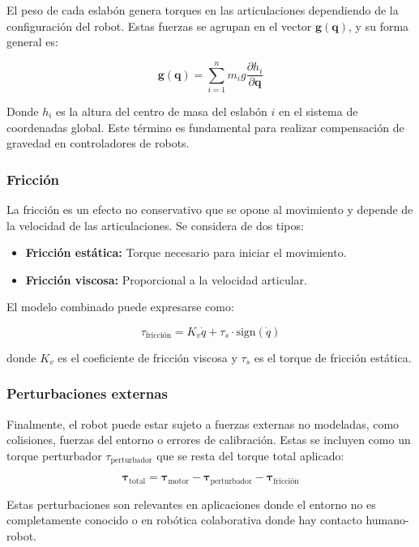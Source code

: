 El peso de cada eslabón genera torques en las articulaciones dependiendo de la configuración del robot. Estas fuerzas se agrupan en el vector \( \mathbf{g}(\mathbf{q}) \), y su forma general es:

\begin{equation}
	\mathbf{g}(\mathbf{q}) = \sum_{i=1}^{n} m_i g \frac{\partial h_i}{\partial \mathbf{q}}
\end{equation}

Donde \( h_i \) es la altura del centro de masa del eslabón \( i \) en el sistema de coordenadas global. Este término es fundamental para realizar compensación de gravedad en controladores de robots.

\subsubsection{Fricción}

La fricción es un efecto no conservativo que se opone al movimiento y depende de la velocidad de las articulaciones. Se considera de dos tipos:

\begin{itemize}
	\item \textbf{Fricción estática:} Torque necesario para iniciar el movimiento.
	\item \textbf{Fricción viscosa:} Proporcional a la velocidad articular.
\end{itemize}

El modelo combinado puede expresarse como:

\begin{equation}
	\tau_{\text{fricción}} = K_v \dot{q} + \tau_s \cdot \text{sign}(\dot{q})
\end{equation}

donde \( K_v \) es el coeficiente de fricción viscosa y \( \tau_s \) es el torque de fricción estática.

\subsubsection{Perturbaciones externas}

Finalmente, el robot puede estar sujeto a fuerzas externas no modeladas, como colisiones, fuerzas del entorno o errores de calibración. Estas se incluyen como un torque perturbador \( \tau_{\text{perturbador}} \) que se resta del torque total aplicado:

\begin{equation}
	\boldsymbol{\tau}_{\text{total}} = \boldsymbol{\tau}_{\text{motor}} - \boldsymbol{\tau}_{\text{perturbador}} - \boldsymbol{\tau}_{\text{fricción}}
\end{equation}

Estas perturbaciones son relevantes en aplicaciones donde el entorno no es completamente conocido o en robótica colaborativa donde hay contacto humano-robot.
